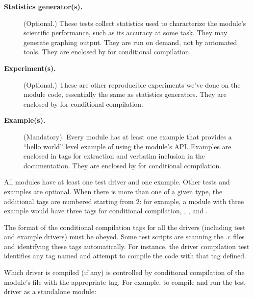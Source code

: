 \begin{description}
\item[\textbf{Statistics generator(s).}] (Optional.) These tests collect
  statistics used to characterize the module's scientific performance,
  such as its accuracy at some task. They may generate graphing
  output. They are run on demand, not by automated tools. They are
  enclosed by 
  for conditional compilation.

\item[\textbf{Experiment(s).}] (Optional.) These are other reproducible
  experiments we've done on the module code, essentially the same as
  statistics generators. They are
  enclosed by 
  for conditional compilation.

\item[\textbf{Example(s).}] (Mandatory). Every module has at least one example
   that provides a ``hello world'' level example of
  using the module's API. Examples are enclosed in 
  tags for extraction and verbatim inclusion in the documentation.
  They are enclosed by  
  for conditional compilation.
\end{description}  

All modules have at least one test driver and one example. Other tests
and examples are optional. When there is more than one 
of a given type, the additional tags are numbered starting from 2: for
example, a module with three example  would have three
tags for conditional compilation, ,
, and .

The format of the conditional compilation tags for all the drivers
(including test and example drivers) must be obeyed. Some test scripts
are scanning the .c files and identifying these tags
automatically. For instance, the driver compilation test identifies any
tag named
and attempt to compile the code with that tag defined.

Which driver is compiled (if any) is controlled by conditional
compilation of the module's  file with the appropriate
tag. For example, to compile and run the  test driver as
a standalone module:

\begin{cchunk}
\end{cchunk}

